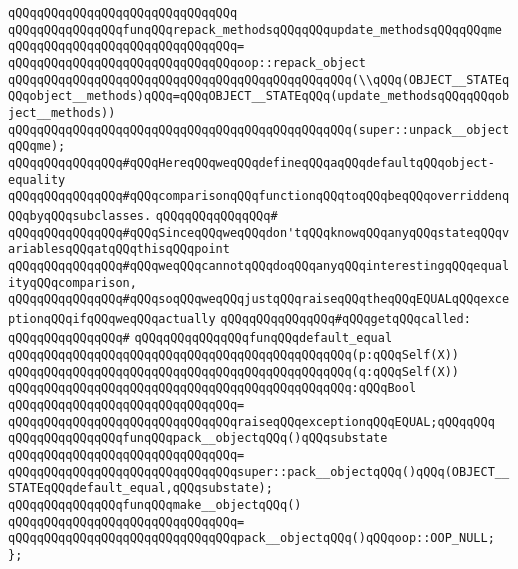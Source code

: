 \verb|qQQqqQQqqQQqqQQqqQQqqQQqqQQqqQQq|\newline
\verb|qQQqqQQqqQQqqQQqfunqQQqrepack_methodsqQQqqQQqupdate_methodsqQQqqQQqme|\newline
\verb|qQQqqQQqqQQqqQQqqQQqqQQqqQQqqQQq=|\newline
\verb|qQQqqQQqqQQqqQQqqQQqqQQqqQQqqQQqoop::repack_object|\newline
\verb|qQQqqQQqqQQqqQQqqQQqqQQqqQQqqQQqqQQqqQQqqQQqqQQq(\\qQQq(OBJECT__STATEqQQqobject__methods)qQQq=qQQqOBJECT__STATEqQQq(update_methodsqQQqqQQqobject__methods))|\newline
\verb|qQQqqQQqqQQqqQQqqQQqqQQqqQQqqQQqqQQqqQQqqQQqqQQq(super::unpack__objectqQQqme);|\newline
\newline
\verb|qQQqqQQqqQQqqQQq#qQQqHereqQQqweqQQqdefineqQQqaqQQqdefaultqQQqobject-equality|\newline
\verb|qQQqqQQqqQQqqQQq#qQQqcomparisonqQQqfunctionqQQqtoqQQqbeqQQqoverriddenqQQqbyqQQqsubclasses.|\newline
\verb|qQQqqQQqqQQqqQQq#|\newline
\verb|qQQqqQQqqQQqqQQq#qQQqSinceqQQqweqQQqdon'tqQQqknowqQQqanyqQQqstateqQQqvariablesqQQqatqQQqthisqQQqpoint|\newline
\verb|qQQqqQQqqQQqqQQq#qQQqweqQQqcannotqQQqdoqQQqanyqQQqinterestingqQQqequalityqQQqcomparison,|\newline
\verb|qQQqqQQqqQQqqQQq#qQQqsoqQQqweqQQqjustqQQqraiseqQQqtheqQQqEQUALqQQqexceptionqQQqifqQQqweqQQqactually|\newline
\verb|qQQqqQQqqQQqqQQq#qQQqgetqQQqcalled:|\newline
\verb|qQQqqQQqqQQqqQQq#|\newline
\verb|qQQqqQQqqQQqqQQqfunqQQqdefault_equal|\newline
\verb|qQQqqQQqqQQqqQQqqQQqqQQqqQQqqQQqqQQqqQQqqQQqqQQq(p:qQQqSelf(X))|\newline
\verb|qQQqqQQqqQQqqQQqqQQqqQQqqQQqqQQqqQQqqQQqqQQqqQQq(q:qQQqSelf(X))|\newline
\verb|qQQqqQQqqQQqqQQqqQQqqQQqqQQqqQQqqQQqqQQqqQQqqQQq:qQQqBool|\newline
\verb|qQQqqQQqqQQqqQQqqQQqqQQqqQQqqQQq=|\newline
\verb|qQQqqQQqqQQqqQQqqQQqqQQqqQQqqQQqraiseqQQqexceptionqQQqEQUAL;qQQqqQQq|\newline
\newline
\verb|qQQqqQQqqQQqqQQqfunqQQqpack__objectqQQq()qQQqsubstate|\newline
\verb|qQQqqQQqqQQqqQQqqQQqqQQqqQQqqQQq=|\newline
\verb|qQQqqQQqqQQqqQQqqQQqqQQqqQQqqQQqsuper::pack__objectqQQq()qQQq(OBJECT__STATEqQQqdefault_equal,qQQqsubstate);|\newline
\newline
\verb|qQQqqQQqqQQqqQQqfunqQQqmake__objectqQQq()|\newline
\verb|qQQqqQQqqQQqqQQqqQQqqQQqqQQqqQQq=|\newline
\verb|qQQqqQQqqQQqqQQqqQQqqQQqqQQqqQQqpack__objectqQQq()qQQqoop::OOP_NULL;|\newline
\verb|};|\newline
\newline

